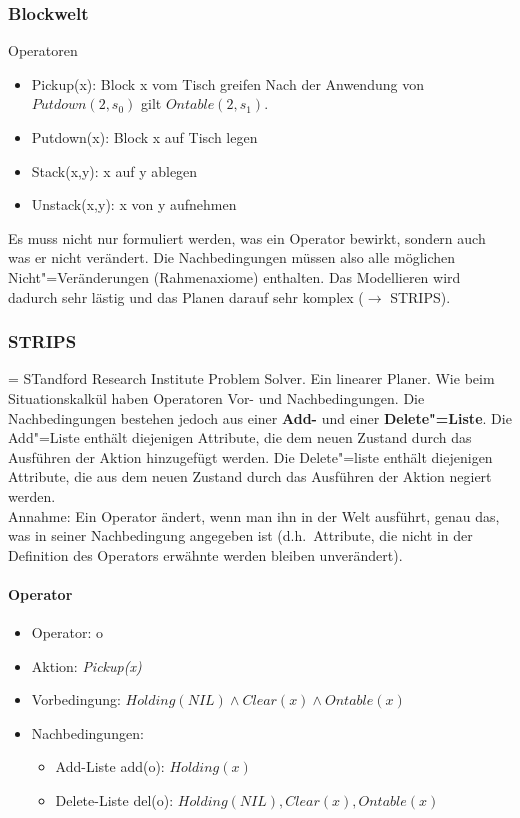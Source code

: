 \subsubsection{Blockwelt}
Operatoren
\begin{itemize}
	\item Pickup(x): Block x vom Tisch greifen
	Nach der Anwendung von $Putdown(2,s_0)$ gilt $Ontable(2,s_1)$.
	\item Putdown(x): Block x auf Tisch legen
	\item Stack(x,y): x auf y ablegen
	\item Unstack(x,y): x von y aufnehmen
\end{itemize}
Es muss nicht nur formuliert werden, was ein Operator bewirkt, sondern auch was er nicht verändert.
Die Nachbedingungen müssen also alle möglichen Nicht"=Veränderungen (Rahmenaxiome) enthalten.
Das Modellieren wird dadurch sehr lästig und das Planen darauf sehr komplex ($\rightarrow$ STRIPS).

\subsubsection{STRIPS}
= STandford Research Institute Problem Solver.
Ein linearer Planer.
Wie beim Situationskalkül haben Operatoren Vor- und Nachbedingungen.
Die Nachbedingungen bestehen jedoch aus einer \textbf{Add-} und einer \textbf{Delete"=Liste}.
Die Add"=Liste enthält diejenigen Attribute, die dem neuen Zustand durch das Ausführen der Aktion hinzugefügt werden.
Die Delete"=liste enthält diejenigen Attribute, die aus dem neuen Zustand durch das Ausführen der Aktion negiert werden.\\

Annahme: Ein Operator ändert, wenn man ihn in der Welt ausführt, genau das, was in seiner Nachbedingung angegeben ist (d.h.\ Attribute, die nicht in der Definition des Operators erwähnte werden bleiben unverändert).

\paragraph{Operator}
\begin{itemize}
	\item Operator: o
	\item Aktion: \emph{Pickup(x)}
	\item Vorbedingung: $Holding(NIL) \wedge Clear(x) \wedge Ontable(x)$
	\item Nachbedingungen:
	\begin{itemize}
		\item Add-Liste add(o): $Holding(x)$
		\item Delete-Liste del(o): $Holding(NIL), Clear(x), Ontable(x)$
	\end{itemize}
\end{itemize}

